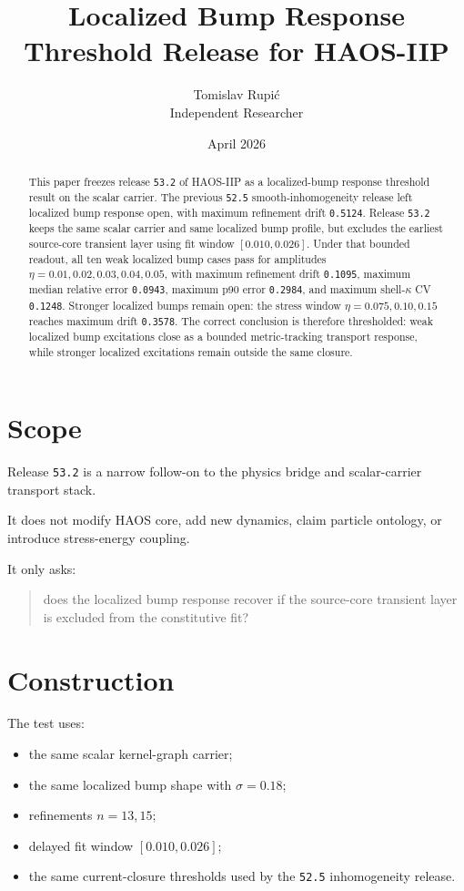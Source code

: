 \documentclass[11pt]{article}
\title{Localized Bump Response Threshold Release for HAOS-IIP}
\author{Tomislav Rupi\'c \\ Independent Researcher}
\date{April 2026}
\begin{document}
\maketitle

\begin{abstract}
This paper freezes release \texttt{53.2} of HAOS-IIP as a localized-bump response threshold result on the scalar carrier. The previous \texttt{52.5} smooth-inhomogeneity release left localized bump response open, with maximum refinement drift \texttt{0.5124}. Release \texttt{53.2} keeps the same scalar carrier and same localized bump profile, but excludes the earliest source-core transient layer using fit window \([0.010, 0.026]\). Under that bounded readout, all ten weak localized bump cases pass for amplitudes \(\eta = 0.01, 0.02, 0.03, 0.04, 0.05\), with maximum refinement drift \texttt{0.1095}, maximum median relative error \texttt{0.0943}, maximum p90 error \texttt{0.2984}, and maximum shell-\(\kappa\) CV \texttt{0.1248}. Stronger localized bumps remain open: the stress window \(\eta = 0.075, 0.10, 0.15\) reaches maximum drift \texttt{0.3578}. The correct conclusion is therefore thresholded: weak localized bump excitations close as a bounded metric-tracking transport response, while stronger localized excitations remain outside the same closure.
\end{abstract}

\tableofcontents

\section{Scope}

Release \texttt{53.2} is a narrow follow-on to the physics bridge and scalar-carrier transport stack.

It does not modify HAOS core, add new dynamics, claim particle ontology, or introduce stress-energy coupling.

It only asks:
\begin{quote}
does the localized bump response recover if the source-core transient layer is excluded from the constitutive fit?
\end{quote}

\section{Construction}

The test uses:
\begin{itemize}
\item the same scalar kernel-graph carrier;
\item the same localized bump shape with \(\sigma = 0.18\);
\item refinements \(n = 13, 15\);
\item delayed fit window \([0.010, 0.026]\);
\item the same current-closure thresholds used by the \texttt{52.5} inhomogeneity release.
\end{itemize}
\end{document}
